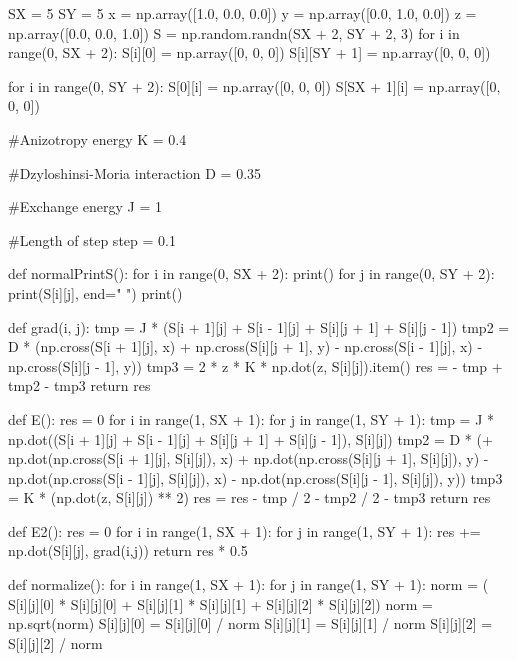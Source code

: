 \documentclass[ 12pt,x11names]{article}
\begin{document}
 \begin{python}

SX = 5
SY = 5
x = np.array([1.0, 0.0, 0.0])
y = np.array([0.0, 1.0, 0.0])
z = np.array([0.0, 0.0, 1.0])
S = np.random.randn(SX + 2, SY + 2, 3)
for i in range(0, SX + 2):
    S[i][0] = np.array([0, 0, 0])
    S[i][SY + 1] = np.array([0, 0, 0])

for i in range(0, SY + 2):
    S[0][i] = np.array([0, 0, 0])
    S[SX + 1][i] = np.array([0, 0, 0])

#Anizotropy energy
K = 0.4

#Dzyloshinsi-Moria  interaction
D = 0.35

#Exchange  energy
J = 1

#Length of step
step = 0.1

def normalPrintS():
    for i in range(0, SX + 2):
        print()
        for j in range(0, SY + 2):
            print(S[i][j], end=" ")
    print()


def grad(i, j):
    tmp = J * (S[i + 1][j] + S[i - 1][j]
             + S[i][j + 1] + S[i][j - 1])
    tmp2 = D * (np.cross(S[i + 1][j], x)
              + np.cross(S[i][j + 1], y)
              - np.cross(S[i - 1][j], x)
              - np.cross(S[i][j - 1], y))
    tmp3 = 2 * z * K * np.dot(z, S[i][j]).item()
    res = - tmp + tmp2 - tmp3
    return res


def E():
    res = 0
    for i in range(1, SX + 1):
        for j in range(1, SY + 1):
            tmp = J * np.dot((S[i + 1][j] + S[i - 1][j]
                            + S[i][j + 1] + S[i][j - 1]), S[i][j])
            tmp2 = D * (+ np.dot(np.cross(S[i + 1][j], S[i][j]), x)
                        + np.dot(np.cross(S[i][j + 1], S[i][j]), y)
                        - np.dot(np.cross(S[i - 1][j], S[i][j]), x)
                        - np.dot(np.cross(S[i][j - 1], S[i][j]), y))
            tmp3 = K * (np.dot(z, S[i][j]) ** 2)
            res = res - tmp / 2 - tmp2 / 2 - tmp3
    return res

def E2():
    res = 0
    for i in range(1, SX + 1):
        for j in range(1, SY + 1):
            res += np.dot(S[i][j], grad(i,j))
    return res * 0.5

def normalize():
    for i in range(1, SX + 1):
        for j in range(1, SY + 1):
            norm = (
            S[i][j][0] * S[i][j][0] +
            S[i][j][1] * S[i][j][1] +
            S[i][j][2] * S[i][j][2])
            norm = np.sqrt(norm)
            S[i][j][0] = S[i][j][0] / norm
            S[i][j][1] = S[i][j][1] / norm
            S[i][j][2] = S[i][j][2] / norm


\end{python}
\end{document}
